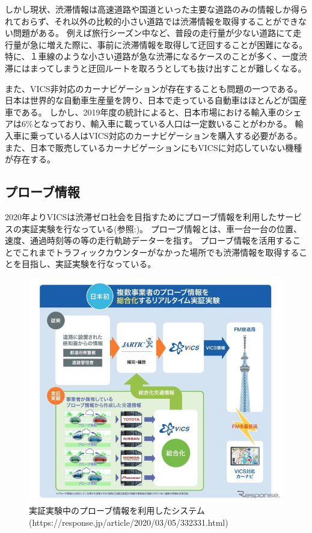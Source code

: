 
しかし現状、渋滞情報は高速道路や国道といった主要な道路のみの情報しか得られておらず、それ以外の比較的小さい道路では渋滞情報を取得することができない問題がある。
例えば旅行シーズン中など、普段の走行量が少ない道路にて走行量が急に増えた際に、事前に渋滞情報を取得して迂回することが困難になる。
特に、１車線のような小さい道路が急な渋滞になるケースのことが多く、一度渋滞にはまってしまうと迂回ルートを取ろうとしても抜け出すことが難しくなる。

また、VICS非対応のカーナビゲーションが存在することも問題の一つである。
日本は世界的な自動車生産量を誇り、日本で走っている自動車はほとんどが国産車である。
しかし、2019年度の統計によると、日本市場における輸入車のシェアは6\%となっており、輸入車に載っている人口は一定数いることがわかる。
輸入車に乗っている人はVICS対応のカーナビゲーションを購入する必要がある。
また、日本で販売しているカーナビゲーションにもVICSに対応していない機種が存在する。

\subsection{プローブ情報}
2020年よりVICSは渋滞ゼロ社会を目指すためにプローブ情報を利用したサービスの実証実験を行なっている(参照:)。
プローブ情報とは、車一台一台の位置、速度、通過時刻等の等の走行軌跡データーを指す。
プローブ情報を活用することでこれまでトラフィックカウンターがなかった場所でも渋滞情報を取得することを目指し、実証実験を行なっている。

\begin{figure}[htbp]
  \begin{center}
   \includegraphics{figs/probe.jpg}
  \end{center}
  \caption{実証実験中のプローブ情報を利用したシステム(https://response.jp/article/2020/03/05/332331.html)}
  \label{fig:probe}
\end{figure}

